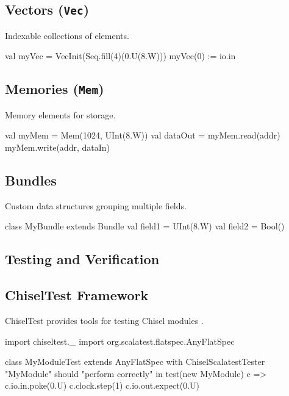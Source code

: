 \subsection{Vectors (\texttt{Vec})}
Indexable collections of elements.
\begin{chiselcode}
val myVec = VecInit(Seq.fill(4)(0.U(8.W)))
myVec(0) := io.in
\end{chiselcode}

\subsection{Memories (\texttt{Mem})}
Memory elements for storage.
\begin{chiselcode}
val myMem = Mem(1024, UInt(8.W))
val dataOut = myMem.read(addr)
myMem.write(addr, dataIn)
\end{chiselcode}

\subsection{Bundles}
Custom data structures grouping multiple fields.
\begin{chiselcode}
class MyBundle extends Bundle {
  val field1 = UInt(8.W)
  val field2 = Bool()
}
\end{chiselcode}

\subsection{Testing and Verification}
\subsection{ChiselTest Framework}
ChiselTest provides tools for testing Chisel modules \cite{chiseltest}.
\begin{chiselcode}
import chiseltest._
import org.scalatest.flatspec.AnyFlatSpec

class MyModuleTest extends AnyFlatSpec with ChiselScalatestTester {
  "MyModule" should "perform correctly" in {
    test(new MyModule) { c =>
      c.io.in.poke(0.U)
      c.clock.step(1)
      c.io.out.expect(0.U)
    }
  }
}
\end{chiselcode}

